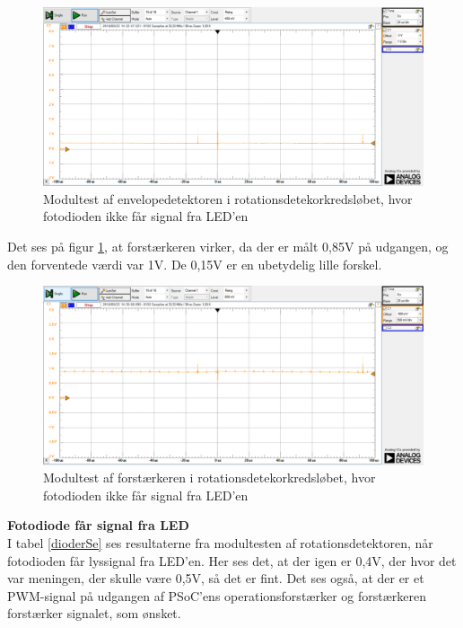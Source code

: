 \begin{figure}[H]
	\centering
	\includegraphics[width=\textwidth]{Test/images/AffyringTest/IkkeSe/envelopedetektor}
	\caption{Modultest af envelopedetektoren i rotationsdetekorkredsløbet, hvor fotodioden ikke får signal fra LED'en}
	\label{fig:envdetIkkeSe}
\end{figure}

\noindent Det ses på figur \ref{fig:envdetIkkeSe}, at forstærkeren virker, da der er målt 0,85V på udgangen, og den forventede værdi var 1V. De 0,15V er en ubetydelig lille forskel. 

\begin{figure}[H]
	\centering
	\includegraphics[width=\textwidth]{Test/images/AffyringTest/IkkeSe/udgang_forstaerker}
	\caption{Modultest af forstærkeren i rotationsdetekorkredsløbet, hvor fotodioden ikke får signal fra LED'en}
	\label{fig:udgangforstaerkerIkkeSe}
\end{figure}

\noindent \textbf{Fotodiode får signal fra LED} \\
\noindent I tabel \ref{dioderSe} ses resultaterne fra modultesten af rotationsdetektoren, når fotodioden får lyssignal fra LED'en. Her ses det, at der igen er 0,4V, der hvor det var meningen, der skulle være 0,5V, så det er fint. Det ses også, at der er et PWM-signal på udgangen af PSoC'ens operationsforstærker og forstærkeren forstærker signalet, som ønsket. 

